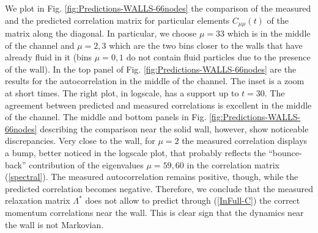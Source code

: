 \documentclass[b5paper,openright,10pt]{book}
\begin{document}
We plot in Fig. \ref{fig:Predictions-WALLS-66nodes} the  comparison of the measured and the
predicted correlation matrix  for particular elements $C_{\mu\mu}(t)$
of the matrix  along the diagonal.  In particular,  we choose $\mu=33$
which is in the middle of the  channel and $\mu=2,3$ which are the two
bins closer to the walls that have already fluid in it (bins $\mu=0,1$
do not contain  fluid particles due to the presence  of the wall).  In
the  top  panel  of  Fig.   \ref{fig:Predictions-WALLS-66nodes} are  the  results  for  the
autocorrelation in the middle of  the channel. The inset is a zoom at short times. The right plot, in logscale,
has  a support  up  to  $t=30$. The  agreement  between predicted  and
measured correlations is excellent in  the middle of the channel.  The
middle  and  bottom  panels  in Fig.   \ref{fig:Predictions-WALLS-66nodes}  describing  the
comparison   near   the   solid   wall,   however,   show   noticeable
discrepancies.   Very close  to  the wall,  for  $\mu=2$ the  measured
correlation displays  a bump,  better noticed  in the  logscale plot,
that  probably  reflects  the   ``bounce-back''  contribution  of  the
eigenvalues  $\mu=59,60$ in  the correlation  matrix (\ref{spectral}).
The  measured  autocorrelation  remains positive,  though,  while  the
predicted correlation  becomes negative.  Therefore, we  conclude that
the measured relaxation  matrix $\Lambda^*$ does not  allow to predict
through (\ref{InFull-C})  the correct  momentum correlations  near the
wall.   This is  clear sign  that the  dynamics near  the wall  is not
Markovian.
\end{document}
